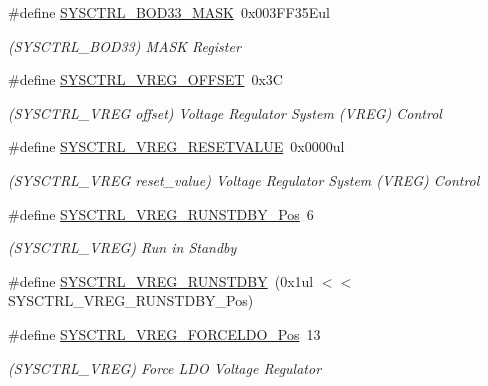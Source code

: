 \begin{DoxyCompactItemize}
\item 
\#define \mbox{\hyperlink{group___s_a_m_d21___s_y_s_c_t_r_l_gac6e31c1527c496cf3e9f782f14862666}{S\+Y\+S\+C\+T\+R\+L\+\_\+\+B\+O\+D33\+\_\+\+M\+A\+SK}}~0x003\+F\+F35\+Eul
\begin{DoxyCompactList}\small\item\em (S\+Y\+S\+C\+T\+R\+L\+\_\+\+B\+O\+D33) M\+A\+SK Register \end{DoxyCompactList}\item 
\#define \mbox{\hyperlink{group___s_a_m_d21___s_y_s_c_t_r_l_ga73230b67566e041f714e37ede70d6de7}{S\+Y\+S\+C\+T\+R\+L\+\_\+\+V\+R\+E\+G\+\_\+\+O\+F\+F\+S\+ET}}~0x3C
\begin{DoxyCompactList}\small\item\em (S\+Y\+S\+C\+T\+R\+L\+\_\+\+V\+R\+EG offset) Voltage Regulator System (V\+R\+EG) Control \end{DoxyCompactList}\item 
\#define \mbox{\hyperlink{group___s_a_m_d21___s_y_s_c_t_r_l_ga215de58f88388bf67a3db111b2506d24}{S\+Y\+S\+C\+T\+R\+L\+\_\+\+V\+R\+E\+G\+\_\+\+R\+E\+S\+E\+T\+V\+A\+L\+UE}}~0x0000ul
\begin{DoxyCompactList}\small\item\em (S\+Y\+S\+C\+T\+R\+L\+\_\+\+V\+R\+EG reset\+\_\+value) Voltage Regulator System (V\+R\+EG) Control \end{DoxyCompactList}\item 
\#define \mbox{\hyperlink{group___s_a_m_d21___s_y_s_c_t_r_l_gab85e5596b995471d532c5f16b9f4af3e}{S\+Y\+S\+C\+T\+R\+L\+\_\+\+V\+R\+E\+G\+\_\+\+R\+U\+N\+S\+T\+D\+B\+Y\+\_\+\+Pos}}~6
\begin{DoxyCompactList}\small\item\em (S\+Y\+S\+C\+T\+R\+L\+\_\+\+V\+R\+EG) Run in Standby \end{DoxyCompactList}\item 
\#define \mbox{\hyperlink{group___s_a_m_d21___s_y_s_c_t_r_l_ga5d28eecd1c96fa8dedd2c4a9bc621b93}{S\+Y\+S\+C\+T\+R\+L\+\_\+\+V\+R\+E\+G\+\_\+\+R\+U\+N\+S\+T\+D\+BY}}~(0x1ul $<$$<$ S\+Y\+S\+C\+T\+R\+L\+\_\+\+V\+R\+E\+G\+\_\+\+R\+U\+N\+S\+T\+D\+B\+Y\+\_\+\+Pos)
\item 
\#define \mbox{\hyperlink{group___s_a_m_d21___s_y_s_c_t_r_l_gabaf9d9b788e87f48b9f809000976afd4}{S\+Y\+S\+C\+T\+R\+L\+\_\+\+V\+R\+E\+G\+\_\+\+F\+O\+R\+C\+E\+L\+D\+O\+\_\+\+Pos}}~13
\begin{DoxyCompactList}\small\item\em (S\+Y\+S\+C\+T\+R\+L\+\_\+\+V\+R\+EG) Force L\+DO Voltage Regulator \end{DoxyCompactList}\item 
$$
\end{DoxyCompactItemize}
